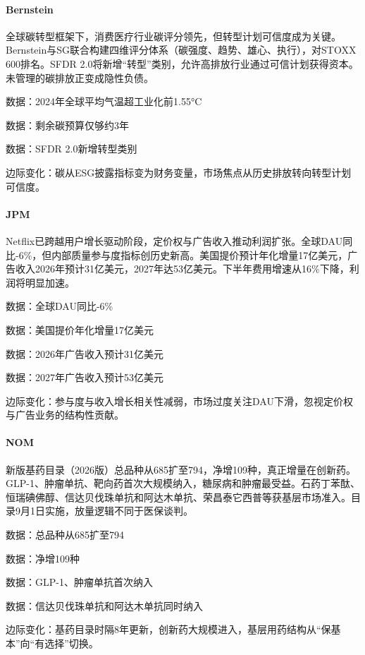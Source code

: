 \documentclass[11pt]{ctexart}
\begin{document}
\paragraph{Bernstein} 全球碳转型框架下，消费医疗行业碳评分领先，但转型计划可信度成为关键。Bernstein与SG联合构建四维评分体系（碳强度、趋势、雄心、执行），对STOXX 600排名。SFDR 2.0将新增“转型”类别，允许高排放行业通过可信计划获得资本。未管理的碳排放正变成隐性负债。
{\small\color{refgray}数据：2024年全球平均气温超工业化前1.55°C\par}
{\small\color{refgray}数据：剩余碳预算仅够约3年\par}
{\small\color{refgray}数据：SFDR 2.0新增转型类别\par}
{\small\color{refgray}边际变化：碳从ESG披露指标变为财务变量，市场焦点从历史排放转向转型计划可信度。\par}
\paragraph{JPM} Netflix已跨越用户增长驱动阶段，定价权与广告收入推动利润扩张。全球DAU同比-6\%，但内部质量参与度指标创历史新高。美国提价预计年化增量17亿美元，广告收入2026年预计31亿美元，2027年达53亿美元。下半年费用增速从16\%下降，利润将明显加速。
{\small\color{refgray}数据：全球DAU同比-6\%\par}
{\small\color{refgray}数据：美国提价年化增量17亿美元\par}
{\small\color{refgray}数据：2026年广告收入预计31亿美元\par}
{\small\color{refgray}数据：2027年广告收入预计53亿美元\par}
{\small\color{refgray}边际变化：参与度与收入增长相关性减弱，市场过度关注DAU下滑，忽视定价权与广告业务的结构性贡献。\par}
\paragraph{NOM} 新版基药目录（2026版）总品种从685扩至794，净增109种，真正增量在创新药。GLP-1、肿瘤单抗、靶向药首次大规模纳入，糖尿病和肿瘤最受益。石药丁苯酞、恒瑞碘佛醇、信达贝伐珠单抗和阿达木单抗、荣昌泰它西普等获基层市场准入。目录9月1日实施，放量逻辑不同于医保谈判。
{\small\color{refgray}数据：总品种从685扩至794\par}
{\small\color{refgray}数据：净增109种\par}
{\small\color{refgray}数据：GLP-1、肿瘤单抗首次纳入\par}
{\small\color{refgray}数据：信达贝伐珠单抗和阿达木单抗同时纳入\par}
{\small\color{refgray}边际变化：基药目录时隔8年更新，创新药大规模进入，基层用药结构从“保基本”向“有选择”切换。\par}
\end{document}
